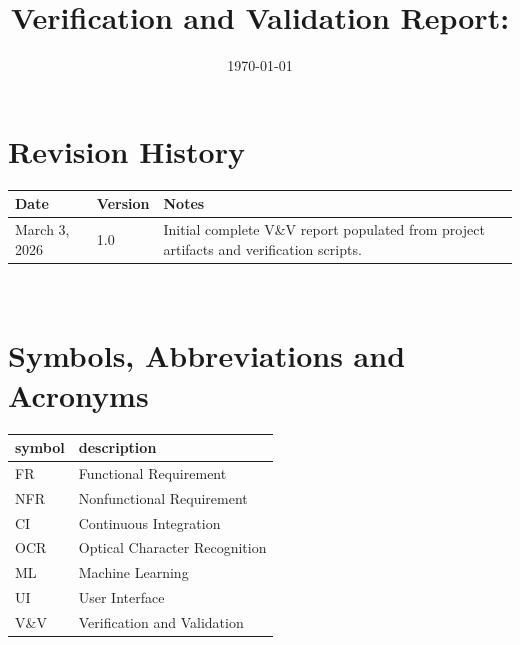 \documentclass[12pt, titlepage]{article}
\begin{document}
\title{Verification and Validation Report: \progname} 
\author{\authname}
\date{\today}
	
\maketitle


\section{Revision History}

\begin{tabularx}{\textwidth}{p{3cm}p{2cm}X}
\toprule {\bf Date} & {\bf Version} & {\bf Notes}\\
\midrule
March 3, 2026 & 1.0 & Initial complete V\&V report populated from project artifacts and verification scripts.\\
\bottomrule
\end{tabularx}

~\newpage

\section{Symbols, Abbreviations and Acronyms}

\renewcommand{\arraystretch}{1.2}
\begin{tabular}{l l} 
  \toprule		
  \textbf{symbol} & \textbf{description}\\
  \midrule 
  FR & Functional Requirement\\
  NFR & Nonfunctional Requirement\\
  CI & Continuous Integration\\
  OCR & Optical Character Recognition\\
  ML & Machine Learning\\
  UI & User Interface\\
  V\&V & Verification and Validation\\
  \bottomrule
\end{tabular}\\

\newpage

\tableofcontents

\listoftables %

\listoffigures %

\newpage

\end{document}
